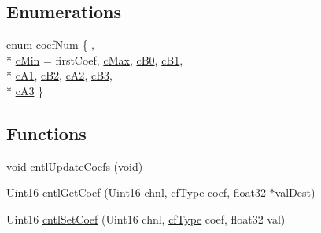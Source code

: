 \subsection*{Enumerations}
\begin{DoxyCompactItemize}
\item 
enum \hyperlink{a00010_a4b8f446b389413b175ff4d4dbcd18da1}{coef\-Num} \{ , \\*
\hyperlink{a00010_a4b8f446b389413b175ff4d4dbcd18da1ad15b967851188a21b2d4fd326304bf83}{c\-Min} = first\-Coef, 
\hyperlink{a00010_a4b8f446b389413b175ff4d4dbcd18da1a3576a9eb4b8f9d1ca3d31a0f9b889299}{c\-Max}, 
\hyperlink{a00010_a4b8f446b389413b175ff4d4dbcd18da1a3dec162fc3f68f49f43775eba612e110}{c\-B0}, 
\hyperlink{a00010_a4b8f446b389413b175ff4d4dbcd18da1a43986b141584b760c8c8c9fc29304de2}{c\-B1}, 
\\*
\hyperlink{a00010_a4b8f446b389413b175ff4d4dbcd18da1aac28a7344b33c5e968a79fc27078da99}{c\-A1}, 
\hyperlink{a00010_a4b8f446b389413b175ff4d4dbcd18da1a5229cb73bab727c5aeaae425a4fd2472}{c\-B2}, 
\hyperlink{a00010_a4b8f446b389413b175ff4d4dbcd18da1a80d8d6d72b42fa8603b71cba71e13ef2}{c\-A2}, 
\hyperlink{a00010_a4b8f446b389413b175ff4d4dbcd18da1aaf02fe4d8a1a90d96d8ceb29c6face14}{c\-B3}, 
\\*
\hyperlink{a00010_a4b8f446b389413b175ff4d4dbcd18da1a23a7967c17fd0f99330009d84750ff62}{c\-A3}
 \}
\end{DoxyCompactItemize}
\subsection*{Functions}
\begin{DoxyCompactItemize}
\item 
void \hyperlink{a00010_ac82b19f3b880ae3bbed395b3194d709e}{cntl\-Update\-Coefs} (void)
\item 
Uint16 \hyperlink{a00010_abc7c9f468b60d7348e835e6473a34b23}{cntl\-Get\-Coef} (Uint16 chnl, \hyperlink{a00010_ac340fbbc5919954c173757935549588f}{cf\-Type} coef, float32 $\ast$val\-Dest)
\item 
Uint16 \hyperlink{a00010_a1b0f822cb4344a66c433d36c8eee2be3}{cntl\-Set\-Coef} (Uint16 chnl, \hyperlink{a00010_ac340fbbc5919954c173757935549588f}{cf\-Type} coef, float32 val)
\end{DoxyCompactItemize}
